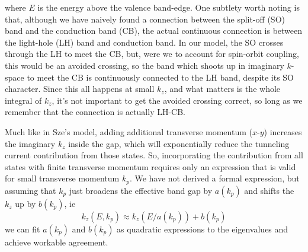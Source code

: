 where $E$ is the energy above the valence band-edge.  One subtlety worth noting is that, although we have naively found a connection between the split-off (SO) band and the conduction band (CB), the actual continuous connection is between the light-hole (LH) band and conduction band.  In our model, the SO crosses through the LH to meet the CB, but, were we to account for spin-orbit coupling, this would be an avoided crossing, so the band which shoots up in imaginary $k$-space to meet the CB is continuously connected to the LH band, despite its SO character.  Since this all happens at small $k_z$, and what matters is the whole integral of $k_z$, it's not important to get the avoided crossing correct, so long as we remember that the connection is actually LH-CB.

Much like in Sze's model, adding additional transverse momentum ($x$-$y$) increases the imaginary $k_z$ inside the gap, which will exponentially reduce the tunneling current contribution from those states.  So, incorporating the contribution from all states with finite transverse momentum requires only an expression that is valid for small transverse momentum $k_p$.  We have not derived a formal expression, but assuming that $k_p$ just broadens the effective band gap by $a(k_p)$ and shifts the $k_z$ up by $b(k_p)$, ie
$$k_z(E,k_p)\approx k_z(E/a(k_p))+b(k_p)$$
we can fit $a(k_p)$ and $b(k_p)$ as quadratic expressions to the eigenvalues and achieve workable agreement.


